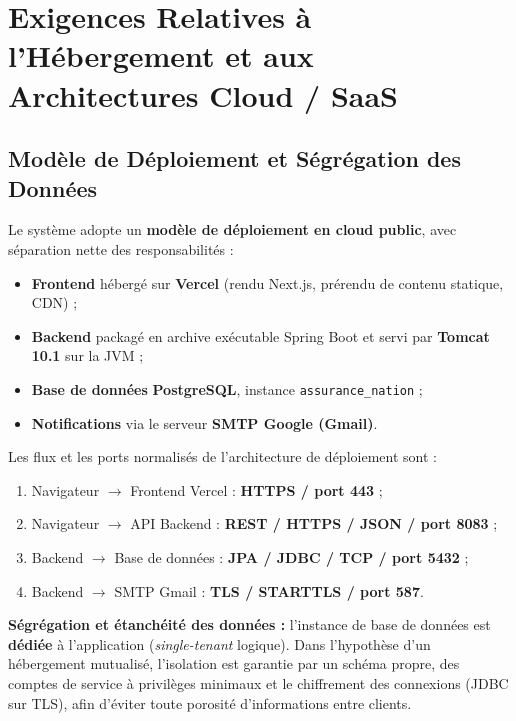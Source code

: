 \documentclass[11pt,a4paper]{article}
\begin{document}
\setcounter{section}{6}
\section{Exigences Relatives à l'Hébergement et aux Architectures Cloud / SaaS}

\subsection{Modèle de Déploiement et Ségrégation des Données}

Le système adopte un \textbf{modèle de déploiement en cloud public}, avec séparation
nette des responsabilités :
\begin{itemize}[leftmargin=1.4em]
  \item \textbf{Frontend} hébergé sur \textbf{Vercel} (rendu Next.js, prérendu de
  contenu statique, CDN) ;
  \item \textbf{Backend} packagé en archive exécutable Spring Boot et servi par
  \textbf{Tomcat 10.1} sur la JVM ;
  \item \textbf{Base de données} \textbf{PostgreSQL}, instance \texttt{assurance\_nation} ;
  \item \textbf{Notifications} via le serveur \textbf{SMTP Google (Gmail)}.
\end{itemize}

Les flux et les ports normalisés de l'architecture de déploiement sont :
\begin{enumerate}[leftmargin=1.6em]
  \item Navigateur $\to$ Frontend Vercel : \textbf{HTTPS / port 443} ;
  \item Navigateur $\to$ API Backend : \textbf{REST / HTTPS / JSON / port 8083} ;
  \item Backend $\to$ Base de données : \textbf{JPA / JDBC / TCP / port 5432} ;
  \item Backend $\to$ SMTP Gmail : \textbf{TLS / STARTTLS / port 587}.
\end{enumerate}

\textbf{Ségrégation et étanchéité des données :} l'instance de base de données est
\textbf{dédiée} à l'application (\emph{single-tenant} logique). Dans l'hypothèse d'un
hébergement mutualisé, l'isolation est garantie par un schéma propre, des comptes de
service à privilèges minimaux et le chiffrement des connexions (JDBC sur TLS), afin
d'éviter toute porosité d'informations entre clients.
\end{document}
